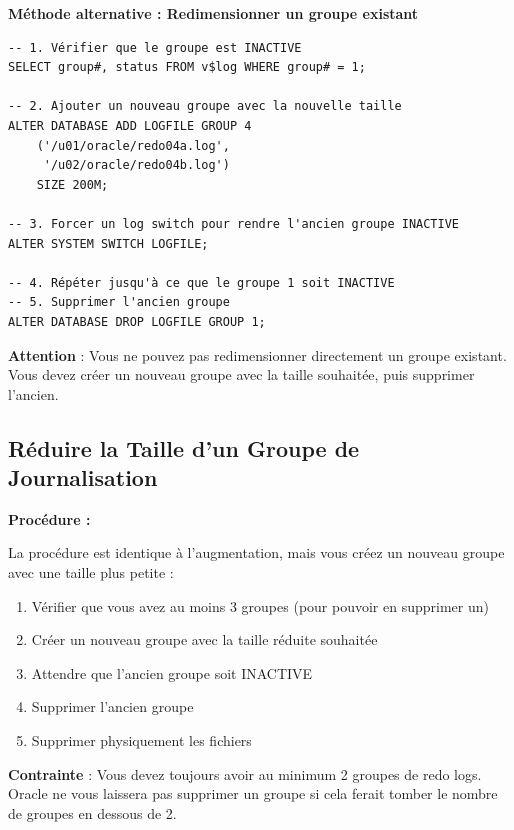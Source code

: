 \documentclass[11pt,a4paper]{article}
\begin{document}
\textbf{Méthode alternative : Redimensionner un groupe existant}

\begin{commandebox}
\begin{lstlisting}
-- 1. Vérifier que le groupe est INACTIVE
SELECT group#, status FROM v$log WHERE group# = 1;

-- 2. Ajouter un nouveau groupe avec la nouvelle taille
ALTER DATABASE ADD LOGFILE GROUP 4 
    ('/u01/oracle/redo04a.log',
     '/u02/oracle/redo04b.log') 
    SIZE 200M;

-- 3. Forcer un log switch pour rendre l'ancien groupe INACTIVE
ALTER SYSTEM SWITCH LOGFILE;

-- 4. Répéter jusqu'à ce que le groupe 1 soit INACTIVE
-- 5. Supprimer l'ancien groupe
ALTER DATABASE DROP LOGFILE GROUP 1;
\end{lstlisting}
\end{commandebox}

\begin{dangerbox}
\textbf{Attention} : Vous ne pouvez pas redimensionner directement un groupe existant. Vous devez créer un nouveau groupe avec la taille souhaitée, puis supprimer l'ancien.
\end{dangerbox}

\subsection{Réduire la Taille d'un Groupe de Journalisation}

\textbf{Procédure :}

La procédure est identique à l'augmentation, mais vous créez un nouveau groupe avec une taille plus petite :

\begin{enumerate}
    \item Vérifier que vous avez au moins 3 groupes (pour pouvoir en supprimer un)
    \item Créer un nouveau groupe avec la taille réduite souhaitée
    \item Attendre que l'ancien groupe soit INACTIVE
    \item Supprimer l'ancien groupe
    \item Supprimer physiquement les fichiers
\end{enumerate}

\begin{importantbox}
\textbf{Contrainte} : Vous devez toujours avoir au minimum 2 groupes de redo logs. Oracle ne vous laissera pas supprimer un groupe si cela ferait tomber le nombre de groupes en dessous de 2.
\end{importantbox}
\end{document}
